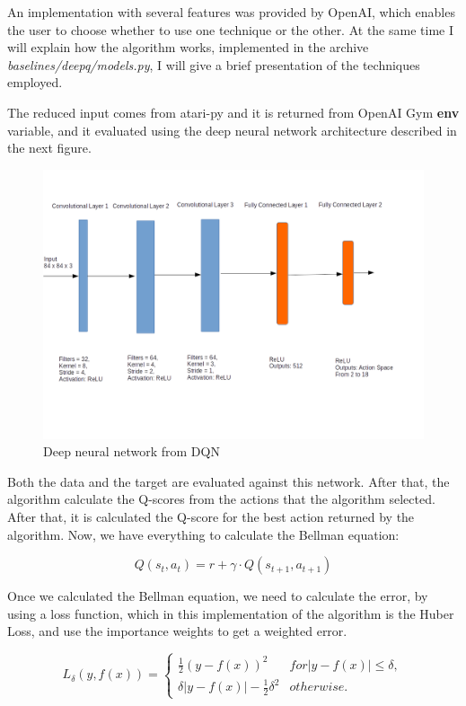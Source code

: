 \documentclass[11pt,twoside,a4paper]{article}
\begin{document}
An implementation with several features was provided by OpenAI, which enables
the user to choose whether to use one technique or the other. At the same time
I will explain how the algorithm works, implemented in the archive
\textit{baselines/deepq/models.py}, I will give a brief
presentation of the techniques employed.

The reduced input comes from atari-py and it is returned from OpenAI Gym
\textbf{env} variable, and it evaluated using the deep neural network
architecture described in the next figure.

\begin{figure}[h!]
  \includegraphics[width=\linewidth]{images/DQN-architecture.png}
  \caption{Deep neural network from DQN}
  \label{fig:dqn-architecture}
\end{figure}

Both the data and the target are evaluated against this network. After that,
the algorithm calculate the Q-scores from the actions that the algorithm
selected. After that, it is calculated the Q-score for the best action returned
by the algorithm. Now, we have everything to calculate the Bellman equation:

$$ Q(s_{t},a_{t}) = r + \gamma \cdot Q(s_{t + 1},a_{t + 1}) $$

Once we calculated the Bellman equation, we need to calculate the error, by
using a loss function, which in this implementation of the algorithm is the
Huber Loss\cite{huber_loss}, and use the importance weights to get a weighted
error.

$$
L_{\delta}(y,f(x)) =
\begin{cases}
  \frac{1}{2}(y - f(x))^2 & for \left|y - f(x)\right| \leq \delta,\\
  \delta\left|y - f(x)\right| - \frac{1}{2}\delta^2 & otherwise.
\end{cases}
$$
\end{document}
